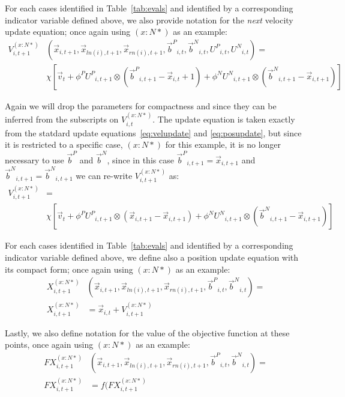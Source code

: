 \documentclass[journal,letterpaper]{IEEEtran}
\providecommand{\pers}{\ensuremath{P}}
\providecommand{\neigh}{\ensuremath{N}}
\providecommand{\nURand}{\ensuremath{U^\neigh}}
\providecommand{\pURand}{\ensuremath{U^\pers}}
\providecommand{\ppos}{\ensuremath{\Vec{x}}}
\providecommand{\pvel}{\ensuremath{\Vec{v}}}
\providecommand{\nbest}{\ensuremath{\Vec{b}^\neigh}}
\providecommand{\pbest}{\ensuremath{\Vec{b}^\pers}}
\providecommand{\constriction}{\ensuremath{\chi}}
\providecommand{\ncoeff}{\ensuremath{\phi^\neigh}}
\providecommand{\pcoeff}{\ensuremath{\phi^\pers}}
\providecommand{\ofunc}{\ensuremath{f}}
\providecommand{\specvel}{\ensuremath{V}}
\providecommand{\specpos}{\ensuremath{X}}
\providecommand{\specval}{\ensuremath{FX}}
\providecommand{\ln}{\ensuremath{ln}}
\providecommand{\rn}{\ensuremath{rn}}
\providecommand{\casexn}{\ensuremath{(x:\neigh*)}}
\begin{document}
For each cases identified in Table~\ref{tab:evals} and identified by a
corresponding indicator variable defined above, we also provide notation for the \emph{next} velocity
update equation; once again using $\casexn$ as an example:
\begin{align}
\nonumber
	\specvel_{i,t+1}^{\casexn} & (\ppos_{i,t+1}, \ppos_{\ln(i),t+1}, \ppos_{\rn(i),t+1},
        \pbest_{i,t} , \nbest_{i,t}, \pURand_{i,t}, \nURand_{i,t})= \\
\label{eq:defvocasexn}
		& \constriction \left[ \pvel_t +
			\pcoeff\pURand_{i,t+1}\otimes(\pbest_{i,t+1} - \ppos_{i,t}+1) +
			\ncoeff\nURand_{i,t+1}\otimes(\nbest_{i,t+1} - \ppos_{i,t+1})
		\right]
\end{align}

Again we will drop the parameters for compactness and since
they can be inferred from the subscripts on $\specvel_{i,t}^{\casexn}$.
The update equation is taken exactly from the statdard update equations~\eqref{eq:velupdate}
and \eqref{eq:posupdate}, but
since it is restricted to a specific case, $\casexn$ for this example,
it is no longer necessary to use $\pbest$ and $\nbest$, since in this case
$\pbest_{i,t+1}=\ppos_{i,t+1}$ and $\nbest_{i,t+1}=\nbest_{i,t+1}$ we can re-write
$\specvel_{i,t+1}^{\casexn}$ as:
\begin{align}
\nonumber
	\specvel_{i,t+1}^{\casexn} & = \\
\label{eq:defvcasexn}
		& \constriction \left[ \pvel_t +
			\pcoeff\pURand_{i,t+1}\otimes(\ppos_{i,t+1} - \ppos_{i,t+1}) +
			\ncoeff\nURand_{i,t+1}\otimes(\nbest_{i,t+1} - \ppos_{i,t+1})
		\right]
\end{align}

For each cases identified in
Table~\ref{tab:evals}
and identified by a corresponding indicator variable defined above,
we define also a position update equation with its compact form; once again using $\casexn$ as an example:
\begin{align}
\label{eq:defpcasexn}
	\specpos_{i,t+1}^{\casexn} & (\ppos_{i,t+1} ,\ppos_{\ln(i),t+1},\ppos_{\rn(i),t+1} ,\pbest_{i,t} ,\nbest_{i,t})= \\
\nonumber
	\specpos_{i,t+1}^{\casexn} & =  \ppos_{i,t} + \specvel_{i,t+1}^{\casexn}
\end{align}

Lastly, we also define notation for the value of the objective function at these points,
once again using $\casexn$ as an example:
\begin{align}
\label{eq:deffcasexn}
	\specval_{i,t+1}^{\casexn} & (\ppos_{i,t+1} ,\ppos_{\ln(i),t+1},\ppos_{\rn(i),t+1} ,\pbest_{i,t} ,\nbest_{i,t})= \\
\nonumber
	\specval_{i,t+1}^{\casexn} & =  \ofunc(\specval_{i,t+1}^{\casexn}
\end{align}
\end{document}
